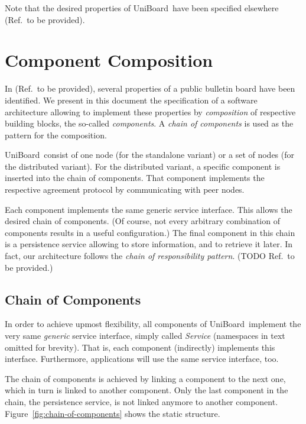 \documentclass[oneside]{scrreprt}
\newcommand{\uniboard}{\mbox{UniBoard}}
\newcommand{\fig}[1]{Figure~\ref{#1}}
\begin{document}
Note that the desired properties of \uniboard\ have been specified
elsewhere (Ref.\ to be provided).


\chapter{Component Composition}

In (Ref.\ to be provided), several properties of a public bulletin
board have been identified. We present in this document the
specification of a software architecture allowing to implement
these properties by \emph{composition} of respective building
blocks, the so-called \emph{components}. A
\emph{chain of components} is used as the pattern for the
composition.

\uniboard\ consist of one node (for the standalone variant) or
a set of nodes (for the distributed variant). For the
distributed variant, a specific component is inserted
into the chain of components. That component implements
the respective agreement protocol by communicating with
peer nodes.

Each component implements the same generic service interface.
This allows the desired chain of components. (Of
course, not every arbitrary combination of components results
in a useful configuration.) The final component in this chain
is a persistence service allowing to store information, and
to retrieve it later. In fact, our architecture follows the
\emph{chain of responsibility pattern}. (TODO Ref.\ to be provided.)


\section{Chain of Components}

In order to achieve upmost flexibility, all components of
\uniboard\ implement the very same \emph{generic} service
interface, simply called \emph{Service} (namespaces in text
omitted for brevity). That is, each component (indirectly)
implements this interface. Furthermore, applications will
use the same service interface, too.

The chain of components is achieved by linking a component
to the next one, which in turn is linked to another component.
Only the last component in the chain, the persistence service, is not
linked anymore to another component. \fig{fig:chain-of-components}
shows the static structure.
\end{document}
